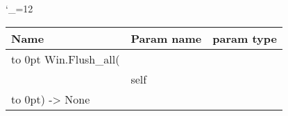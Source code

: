 \begingroup \catcode`\_=12 \tt
\begin{tabular}{lll}
\toprule
\textrm{Name}&\textrm{Param name}&\textrm{param type}\\
\midrule
\hbox to 0pt {Win.Flush_all(\hss}\\
& self\\
\hbox to 0pt{) -> None\hss}\\
\bottomrule
\end{tabular}
\endgroup

